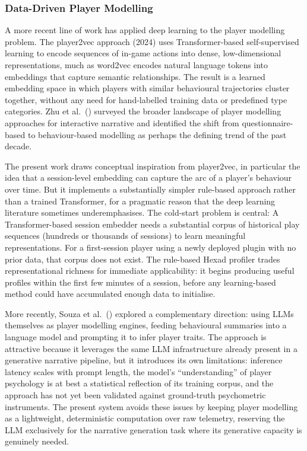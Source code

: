 \subsubsection{Data-Driven Player Modelling}

A more recent line of work has applied deep learning to the player modelling problem. The player2vec approach (2024) uses Transformer-based self-supervised learning to encode sequences of in-game actions into dense, low-dimensional representations, much as word2vec encodes natural language tokens into embeddings that capture semantic relationships. The result is a learned embedding space in which players with similar behavioural trajectories cluster together, without any need for hand-labelled training data or predefined type categories. Zhu et al.\ (\citeyear{zhu2023player}) surveyed the broader landscape of player modelling approaches for interactive narrative and identified the shift from questionnaire-based to behaviour-based modelling as perhaps the defining trend of the past decade.

The present work draws conceptual inspiration from player2vec, in particular the idea that a session-level embedding can capture the arc of a player's behaviour over time. But it implements a substantially simpler rule-based approach rather than a trained Transformer, for a pragmatic reason that the deep learning literature sometimes underemphasises. The cold-start problem is central: A Transformer-based session embedder needs a substantial corpus of historical play sequences (hundreds or thousands of sessions) to learn meaningful representations. For a first-session player using a newly deployed plugin with no prior data, that corpus does not exist. The rule-based Hexad profiler trades representational richness for immediate applicability: it begins producing useful profiles within the first few minutes of a session, before any learning-based method could have accumulated enough data to initialise.

More recently, Souza et al.\ (\citeyear{souza2025leveraging}) explored a complementary direction: using LLMs themselves as player modelling engines, feeding behavioural summaries into a language model and prompting it to infer player traits. The approach is attractive because it leverages the same LLM infrastructure already present in a generative narrative pipeline, but it introduces its own limitations: inference latency scales with prompt length, the model's ``understanding'' of player psychology is at best a statistical reflection of its training corpus, and the approach has not yet been validated against ground-truth psychometric instruments. The present system avoids these issues by keeping player modelling as a lightweight, deterministic computation over raw telemetry, reserving the LLM exclusively for the narrative generation task where its generative capacity is genuinely needed.

